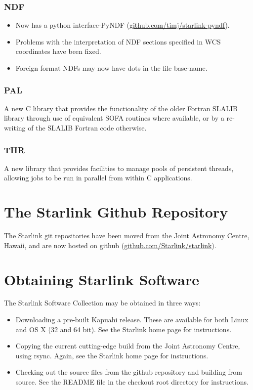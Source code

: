 \documentclass[11pt,twoside]{article}
\begin{document}
\subsubsection{NDF}
\begin{itemize}
\item Now has a python interface-PyNDF (\url{github.com/timj/starlink-pyndf}).
\item Problems with the interpretation of NDF sections specified in WCS coordinates have been fixed.
\item Foreign format NDFs may now have dots in the file base-name.
\end{itemize}

\subsubsection{PAL}
A new C library that provides the functionality of the older Fortran SLALIB library through use of equivalent SOFA routines where available, or by a re-writing of the SLALIB Fortran code otherwise.

\subsubsection{THR}
A new library that provides facilities to manage pools of persistent threads, allowing jobs to be run in parallel from within C applications.

\section{The Starlink Github Repository}
The Starlink git repositories have been moved from the Joint Astronomy
Centre, Hawaii, and are now hosted on github
(\url{github.com/Starlink/starlink}).

\section{Obtaining Starlink Software}
The Starlink Software Collection may be obtained in three ways:
\begin{itemize}
\item Downloading a pre-built Kapuahi release. These are available for both Linux and OS X (32 and 64 bit). See the Starlink home page for instructions.
\item Copying the current cutting-edge build from the Joint Astronomy Centre, using rsync. Again, see the Starlink home page for instructions.
\item Checking out the source files from the github repository and building from source. See the README file in the checkout root directory for instructions.
\end{itemize}



\end{document}
